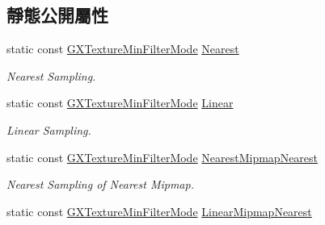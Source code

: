 \subsection*{靜態公開屬性}
\begin{DoxyCompactItemize}
\item 
static const \hyperlink{class_magnum_1_1_g_x_texture_min_filter_mode}{G\+X\+Texture\+Min\+Filter\+Mode} \hyperlink{class_magnum_1_1_g_x_texture_min_filter_mode_aad4e72fe16fa57c5124a1baef1ff3e9e}{Nearest}\hypertarget{class_magnum_1_1_g_x_texture_min_filter_mode_aad4e72fe16fa57c5124a1baef1ff3e9e}{}\label{class_magnum_1_1_g_x_texture_min_filter_mode_aad4e72fe16fa57c5124a1baef1ff3e9e}

\begin{DoxyCompactList}\small\item\em Nearest Sampling. \end{DoxyCompactList}\item 
static const \hyperlink{class_magnum_1_1_g_x_texture_min_filter_mode}{G\+X\+Texture\+Min\+Filter\+Mode} \hyperlink{class_magnum_1_1_g_x_texture_min_filter_mode_a35ed4beff3af17df7d5d3e3e8b6864a8}{Linear}\hypertarget{class_magnum_1_1_g_x_texture_min_filter_mode_a35ed4beff3af17df7d5d3e3e8b6864a8}{}\label{class_magnum_1_1_g_x_texture_min_filter_mode_a35ed4beff3af17df7d5d3e3e8b6864a8}

\begin{DoxyCompactList}\small\item\em Linear Sampling. \end{DoxyCompactList}\item 
static const \hyperlink{class_magnum_1_1_g_x_texture_min_filter_mode}{G\+X\+Texture\+Min\+Filter\+Mode} \hyperlink{class_magnum_1_1_g_x_texture_min_filter_mode_af9fb593836f3a09a4740a9358972399f}{Nearest\+Mipmap\+Nearest}\hypertarget{class_magnum_1_1_g_x_texture_min_filter_mode_af9fb593836f3a09a4740a9358972399f}{}\label{class_magnum_1_1_g_x_texture_min_filter_mode_af9fb593836f3a09a4740a9358972399f}

\begin{DoxyCompactList}\small\item\em Nearest Sampling of Nearest Mipmap. \end{DoxyCompactList}\item 
static const \hyperlink{class_magnum_1_1_g_x_texture_min_filter_mode}{G\+X\+Texture\+Min\+Filter\+Mode} \hyperlink{class_magnum_1_1_g_x_texture_min_filter_mode_ae938ccd81f03a12d7f21ff2ab96eb562}{Linear\+Mipmap\+Nearest}\hypertarget{class_magnum_1_1_g_x_texture_min_filter_mode_ae938ccd81f03a12d7f21ff2ab96eb562}{}\label{class_magnum_1_1_g_x_texture_min_filter_mode_ae938ccd81f03a12d7f21ff2ab96eb562}


\end{DoxyCompactItemize}
